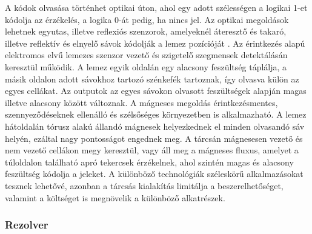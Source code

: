A kódok olvasása történhet optikai úton, ahol egy adott szélességen a logikai 1-et kódolja az érzékelés, a logika 0-át pedig, ha nincs jel. Az optikai megoldások lehetnek egyutas, illetve reflexiós szenzorok, amelyeknél áteresztő és takaró, illetve reflektív és elnyelő sávok kódolják a lemez pozícióját \cite{Morris2016b}. Az érintkezés alapú elektromos elvű lemezes szenzor vezető és szigetelő szegmensek detektálásán keresztül működik. A lemez egyik oldalán egy alacsony feszültség táplálja, a másik oldalon adott sávokhoz tartozó szénkefék tartoznak, így olvasva külön az egyes cellákat. Az outputok az egyes sávokon olvasott feszültségek alapján magas illetve alacsony között változnak. A mágneses megoldás érintkezésmentes, szennyeződéseknek ellenálló és szélsőséges környezetben is alkalmazható. A lemez hátoldalán tórusz alakú állandó mágnesek helyezkednek el minden olvasandó sáv helyén, ezáltal nagy pontosságot engednek meg. A tárcsán mágnesesen vezető és nem vezető cellákon megy keresztül, vagy áll meg a mágneses fluxus, amelyet a túloldalon található apró tekercsek érzékelnek, ahol szintén magas és alacsony feszültség kódolja a jeleket. A különböző technológiák széleskörű alkalmazásokat tesznek lehetővé, azonban a tárcsás kialakítás limitálja a beszerelhetőséget, valamint a költséget is megnövelik a különböző alkatrészek.

\subsubsection{Rezolver}


